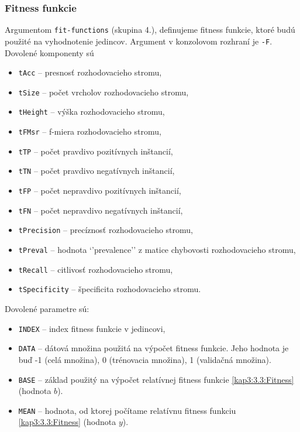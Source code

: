 \subsubsection*{Fitness funkcie}
Argumentom \verb|fit-functions| (skupina 4.), definujeme fitness funkcie, ktoré budú použité na vyhodnotenie jedincov. Argument v konzolovom rozhraní je \verb|-F|.
Dovolené komponenty sú 
\begin{itemize}
\item \verb|tAcc| -- presnosť rozhodovacieho stromu,
\item \verb|tSize|  -- počet vrcholov rozhodovacieho stromu,
\item \verb|tHeight| -- výška rozhodovacieho stromu,
\item \verb|tFMsr| -- f-miera rozhodovacieho stromu,
\item \verb|tTP| -- počet pravdivo pozitívnych inštancií,
\item \verb|tTN| -- počet pravdivo negatívnych inštancií,
\item \verb|tFP| -- počet nepravdivo pozitívnych inštancií,
\item \verb|tFN| -- počet nepravdivo negatívnych inštancií,
\item \verb|tPrecision| -- precíznosť rozhodovacieho stromu,
\item \verb|tPreval| -- hodnota `'prevalence'' z matice chybovosti rozhodovacieho stromu,
\item \verb|tRecall| -- citlivosť rozhodovacieho stromu,
\item \verb|tSpecificity| -- špecificita rozhodovacieho stromu.
\end{itemize}

Dovolené parametre sú:
\begin{itemize}
\item \verb|INDEX| -- index fitness funkcie v jedincovi,
\item \verb|DATA| -- dátová množina použitá na výpočet fitness funkcie. Jeho hodnota je buď -1 (celá množina), 0 (trénovacia množina), 1 (validačná množina).
\item \verb|BASE| -- základ použitý na výpočet relatívnej fitness funkcie \ref{kap3:3.3:Fitness} (hodnota $b$).
\item \verb|MEAN| -- hodnota, od ktorej počítame relatívnu fitness funkciu \ref{kap3:3.3:Fitness} (hodnota $y$).
\end{itemize}

